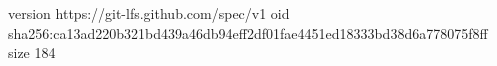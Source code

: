 version https://git-lfs.github.com/spec/v1
oid sha256:ca13ad220b321bd439a46db94eff2df01fae4451ed18333bd38d6a778075f8ff
size 184
